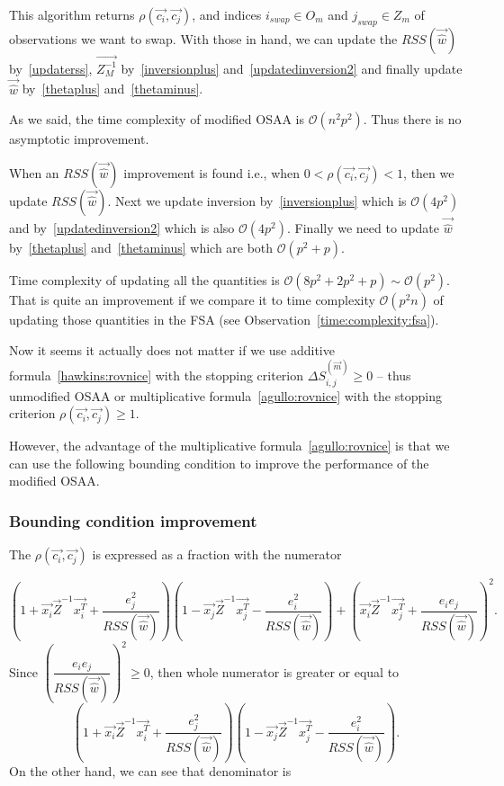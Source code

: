 This algorithm returns $\rho(\vec{c_i}, \vec{c_j})$, and indices  $i_{swap} \in O_m$ and $j_{swap} \in Z_m$ of observations we want to swap. With those in hand, we can update the $RSS(\vec{\hat{w}})$ by~\eqref{updaterss}, $\vec{Z_M^{-1}}$ by~\eqref{inversionplus} and~\eqref{updatedinversion2} and finally update $\vec{\hat{w}}$ by~\eqref{thetaplus} and~\eqref{thetaminus}.

As we said, the time complexity of modified OSAA is $\mathcal{O}( n^2 p^2)$. Thus there is no asymptotic improvement.

When an $RSS(\vec{\hat{w}})$ improvement is found i.e., when $0 < \rho(\vec{c_i}, \vec{c_j}) < 1 $, then we update $RSS(\vec{\hat{w}})$. Next we update inversion by~\eqref{inversionplus} which is $\mathcal{O}(4p^2)$ and by~\eqref{updatedinversion2} which is also $\mathcal{O}(4p^2)$.  Finally we need to update $\vec{\hat{w}}$ by~\eqref{thetaplus} and~\eqref{thetaminus} which are both $\mathcal{O}(p^2 +p)$. 

Time complexity of updating all the quantities is 
$\mathcal{O}(8p^2 + 2p^2 + p) \sim \mathcal{O}(p^2)$.
That is quite an improvement if we compare it to time complexity $\mathcal{O}(p^2n)$ of updating those quantities in the FSA (see Observation~\ref{time:complexity:fsa}).


Now it seems it actually does not matter if we use additive formula~\eqref{hawkins:rovnice} with the stopping criterion $\Delta S^{(\vec{m})}_{i,j} \geq 0$ -- thus unmodified OSAA or multiplicative formula~\eqref{agullo:rovnice} with the stopping criterion $\rho(\vec{c_i}, \vec{c_j}) \geq 1 $. 

However, the advantage of the multiplicative formula~\eqref{agullo:rovnice} is that we can use the following bounding condition to improve the performance of the modified OSAA.



\subsubsection*{Bounding condition improvement}

The $\rho(\vec{c_i}, \vec{c_j})$ is expressed as a fraction with the numerator

\begin{equation}
    (1+\vec{x_i}\vec{Z}^{-1}\vec{x_i^T} + \dfrac{e_j^2}{RSS(\vec{\hat{w}})})
        (1 - \vec{x_j}\vec{Z}^{-1}\vec{x_j^T} - \dfrac{e_i^2}{RSS(\vec{\hat{w}})} )+
        (\vec{x_i}\vec{Z}^{-1}\vec{x_j^T} + \dfrac{e_i e_j}{RSS(\vec{\hat{w}})} )^2.
\end{equation}
Since $ (\dfrac{e_i e_j}{RSS(\vec{\hat{w}})} )^2 \geq 0$, then whole numerator is greater or equal to
\begin{equation}
    (1+\vec{x_i}\vec{Z}^{-1}\vec{x_i^T} + \dfrac{e_j^2}{RSS(\vec{\hat{w}})})
(1 - \vec{x_j}\vec{Z}^{-1}\vec{x_j^T} - \dfrac{e_i^2}{RSS(\vec{\hat{w}})} ).
\end{equation}
On the other hand, we can see that denominator is

